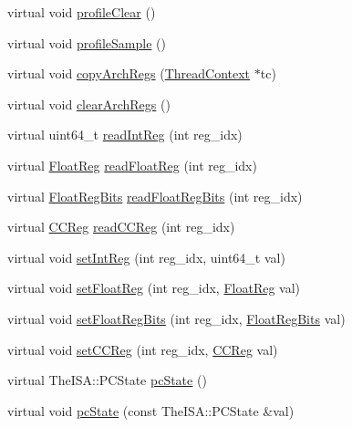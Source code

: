 \begin{DoxyCompactItemize}
\item 
virtual void \hyperlink{classO3ThreadContext_acf9c88860776d7bd752317e8b550a5d5}{profileClear} ()
\item 
virtual void \hyperlink{classO3ThreadContext_aba547b904bdcf83196f983f79d285caf}{profileSample} ()
\item 
virtual void \hyperlink{classO3ThreadContext_a01b372f805c92c90e6148b76d23d6236}{copyArchRegs} (\hyperlink{classThreadContext}{ThreadContext} $\ast$tc)
\item 
virtual void \hyperlink{classO3ThreadContext_ad5c88ea41846742bd8c70d9c50f31945}{clearArchRegs} ()
\item 
virtual uint64\_\-t \hyperlink{classO3ThreadContext_ad1e79749db6bf8c1a5037d798563cd9e}{readIntReg} (int reg\_\-idx)
\item 
virtual \hyperlink{classThreadContext_a75484259f1855aabc8d74c6eb1cfe186}{FloatReg} \hyperlink{classO3ThreadContext_ad85a5b48ebe475a9b1d1d3f31b51b942}{readFloatReg} (int reg\_\-idx)
\item 
virtual \hyperlink{classThreadContext_aab5eeae86499f9bfe15ef79360eccc64}{FloatRegBits} \hyperlink{classO3ThreadContext_a16de1015632e110ed029afa05ffd799d}{readFloatRegBits} (int reg\_\-idx)
\item 
virtual \hyperlink{classThreadContext_a0c9de550a32808e6a25b54b6c791d5ab}{CCReg} \hyperlink{classO3ThreadContext_a490d3d7eda13841557ca14eb877f6236}{readCCReg} (int reg\_\-idx)
\item 
virtual void \hyperlink{classO3ThreadContext_a8fef3127de63ab5e7f7414ea8137c2b1}{setIntReg} (int reg\_\-idx, uint64\_\-t val)
\item 
virtual void \hyperlink{classO3ThreadContext_a6da554ea484b758c095389b1373ffccc}{setFloatReg} (int reg\_\-idx, \hyperlink{classThreadContext_a75484259f1855aabc8d74c6eb1cfe186}{FloatReg} val)
\item 
virtual void \hyperlink{classO3ThreadContext_a2efe7073c68c7a9ab031aa829b5712a5}{setFloatRegBits} (int reg\_\-idx, \hyperlink{classThreadContext_aab5eeae86499f9bfe15ef79360eccc64}{FloatRegBits} val)
\item 
virtual void \hyperlink{classO3ThreadContext_a6930132fc79b2f672ac4076133d103b3}{setCCReg} (int reg\_\-idx, \hyperlink{classThreadContext_a0c9de550a32808e6a25b54b6c791d5ab}{CCReg} val)
\item 
virtual TheISA::PCState \hyperlink{classO3ThreadContext_a0af876e2694c08671975415a22764439}{pcState} ()
\item 
virtual void \hyperlink{classO3ThreadContext_a5e9cfc754c9ef9b7db875ce89871944e}{pcState} (const TheISA::PCState \&val)

\end{DoxyCompactItemize}
